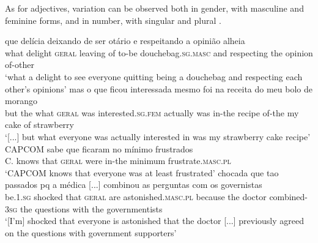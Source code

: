 \documentclass[output=paper]{langscibook}
\begin{document}
As for adjectives, variation can be observed both in gender, with masculine  and feminine  forms, and in number, with singular  and plural .

\ea\label{ex:avelar:21}
 \ea\label{ex:avelar:21a} 
  \gll que delícia  deixando   {de   ser}   otário e     respeitando   a   opinião   alheia \\ %
        what delight   \textsc{geral} leaving   {of   to-be}   douchebag.\textsc{sg.masc} and   respecting   the  opinion   of-other\\
 \glt ‘what a delight to see everyone quitting being a douchebag and respecting each other’s opinions’
 \ex\label{ex:avelar:21b} 
  \gll mas   o que  ficou   interessada mesmo foi     na receita   do     meu   bolo   de morango \\ %
         but   the what   \textsc{geral}   was   interested.\textsc{sg.fem} actually was   in-the recipe   of-the   my   cake   of strawberry\\
  \glt ‘[...] but what everyone was actually interested in was my strawberry cake recipe’
\z 
\ex\label{ex:avelar:22}
 \ea\label{ex:avelar:22a}
  \gll CAPCOM  sabe   que  ficaram no mínimo frustrados\\ %
         C.       knows  that  \textsc{geral} were in-the minimum   frustrate.\textsc{masc.pl}\\ 
  \glt ‘CAPCOM knows that everyone was at least frustrated’
 \ex\label{ex:avelar:22b}
  \gll [estou]   chocada   que  tao   passados pq       {a médica [...]} combinou       as perguntas com   os   governistas\\ %
         be.\textsc{1.sg} shocked   that   \textsc{geral} are   astonished.\textsc{masc.pl} because   {the doctor}   combined-\textsc{3sg} the questions with   the  governmentists\\
  \glt ‘[I’m] shocked that everyone is astonished that the doctor [...] previously agreed on the questions with government supporters’
\z 
\z
\end{document}
